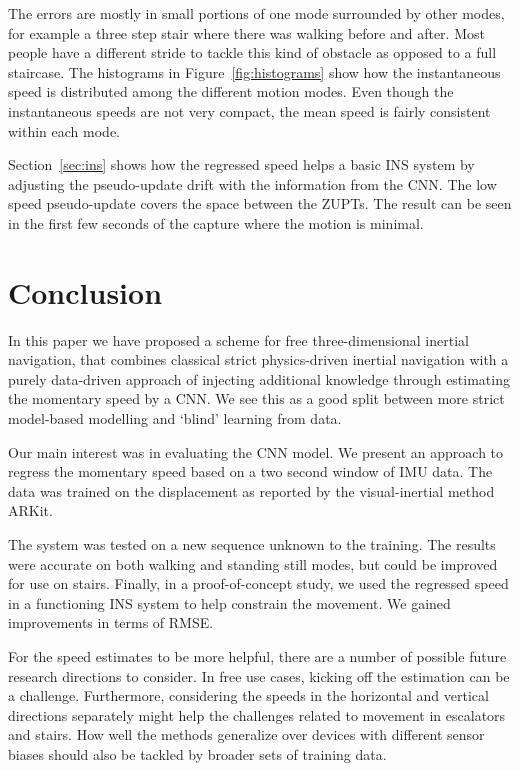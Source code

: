 \documentclass{article}
\begin{document}
The errors are mostly in small portions of one mode surrounded by other modes, for example a three step stair where there was walking before and after. Most people have a different stride to tackle this kind of obstacle as opposed to a full staircase.
The histograms in Figure~\ref{fig:histograms} show how the instantaneous speed is distributed among the different motion modes. Even though the instantaneous speeds are not very compact, the mean speed is fairly consistent within each mode. 

Section~\ref{sec:ins} shows how the regressed speed helps a basic INS system by adjusting the pseudo-update drift with the information from the CNN. The low speed pseudo-update covers the space between the ZUPTs. The result can be seen in the first few seconds of the capture where the motion is minimal.

\section{Conclusion}
In this paper we have proposed a scheme for free three-dimensional inertial navigation, that combines classical strict physics-driven inertial navigation with a purely data-driven approach of injecting additional knowledge through estimating the momentary speed by a CNN. We see this as a good split between more strict model-based modelling and `blind' learning from data. 

Our main interest was in evaluating the CNN model. We present an approach to regress the momentary speed based on a two second window of IMU data. The data was trained on the displacement as reported by the visual-inertial method ARKit.

The system was tested on a new sequence unknown to the training. The results were accurate on both walking and standing still modes, but could be improved for use on stairs. Finally, in a proof-of-concept study, we used the regressed speed in a functioning INS system to help constrain the movement. We gained improvements in terms of RMSE.

For the speed estimates to be more helpful, there are a number of possible future research directions to consider. In free use cases, kicking off the estimation can be a challenge. Furthermore, considering the speeds in the horizontal and vertical directions separately might help the challenges related to movement in escalators and stairs. How well the methods generalize over devices with different sensor biases should also be tackled by broader sets of training data.
\end{document}
